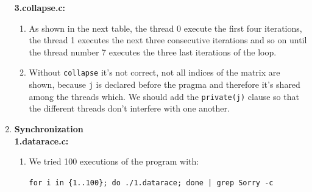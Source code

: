 \begin{enumerate}[label=\textbf{\Alph*)}]
\begin{enumerate}[label=\arabic*.]
    \end{enumerate}
    \textbf{3.collapse.c:}
    \begin{enumerate}[label=\arabic*.]
        \item As shown in the next table, the thread 0 execute the first four iterations, the thread 1 executes the next three consecutive iterations and so on until the thread number 7 executes the three last iterations of the loop.
        \item Without \texttt{collapse} it's not correct, not all indices of the matrix are shown, because \texttt{j} is declared
        before the pragma and therefore it's shared among the threads which. We should add the \texttt{private(j)} clause so that the different 
        threads don't interfere with one another.

    \end{enumerate}
    \pagebreak
    \item \textbf{Synchronization} \\
    \textbf{1.datarace.c:}
    \begin{enumerate}[label=\arabic*.]
        \item We tried 100 executions of the program with: 
        
        \texttt{for i in \{1..100\}; do ./1.datarace; done | grep Sorry -c}
        

\end{enumerate}
\end{enumerate}
